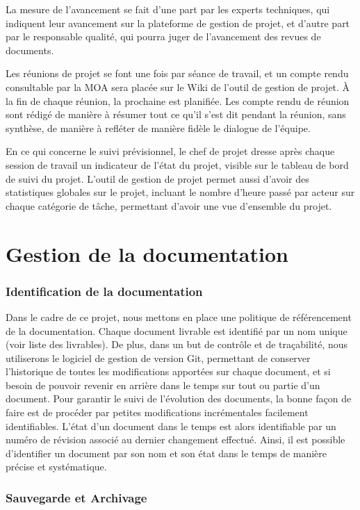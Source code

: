 \documentclass[a4paper, 18pt]{article}
\begin{document}
La mesure de l'avancement se fait d'une part par les experts techniques, qui indiquent leur avancement sur la plateforme de gestion de projet, et d'autre part par le responsable qualité, qui pourra juger de l'avancement des revues de documents.

Les réunions de projet se font une fois par séance de travail, et un compte rendu consultable par la MOA sera placée sur le Wiki de l'outil de gestion de projet. À la fin de chaque réunion, la prochaine est planifiée. Les compte rendu de réunion sont rédigé de manière à résumer tout ce qu'il s'est dit pendant la réunion, sans synthèse, de manière à refléter de manière fidèle le dialogue de l'équipe.

En ce qui concerne le suivi prévisionnel, le chef de projet dresse après chaque session de travail un indicateur de l'état du projet, visible sur le tableau de bord de suivi du projet. L'outil de gestion de projet permet aussi d'avoir des statistiques globales sur le projet, incluant le nombre d'heure passé par acteur sur chaque catégorie de tâche, permettant d'avoir une vue d'ensemble du projet.

\part{Gestion de la documentation}

\section{Identification de la documentation}

Dans le cadre de ce projet, nous mettons en place une politique de référencement de la documentation. Chaque document livrable est identifié par un nom unique (voir liste des livrables). De plus, dans un but de contrôle et de traçabilité, nous utiliserons le logiciel de gestion de version Git, permettant de conserver l'historique de toutes les modifications apportées sur chaque document, et si besoin de pouvoir revenir en arrière dans le temps sur tout ou partie d'un document. Pour garantir le suivi de l'évolution des documents, la bonne façon de faire est de procéder par petites modifications incrémentales facilement identifiables. L'état d'un document dans le temps est alors identifiable par un numéro de révision associé au dernier changement effectué. Ainsi, il est possible d'identifier un document par son nom et son état dans le temps de manière précise et systématique.

\section{Sauvegarde et Archivage}
\end{document}
